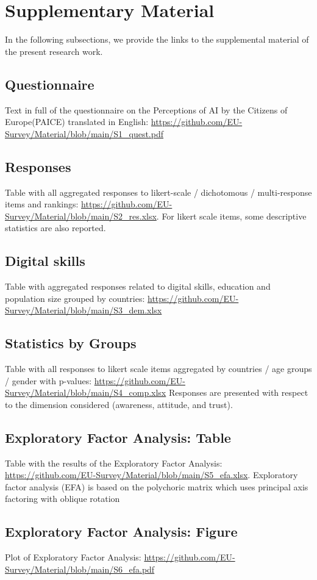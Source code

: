 \documentclass{article}
\begin{document}
\section{Supplementary Material}

In the following subsections, we provide the links to the supplemental material of the present research work. 

\subsection{Questionnaire}
\label{S1_Questionnaire}
Text in full of the questionnaire on the Perceptions of AI by the Citizens of Europe(PAICE) translated in English: \url{https://github.com/EU-Survey/Material/blob/main/S1_quest.pdf} 

\subsection{Responses}
\label{S2_Tab_Resp}

Table with all aggregated responses to likert-scale / dichotomous / multi-response items and rankings: 
\url{https://github.com/EU-Survey/Material/blob/main/S2_res.xlsx}. 
For likert scale items, some descriptive statistics are also reported.

\subsection{Digital skills}
\label{S3_Tab_Dem}

Table with aggregated responses related to digital skills, education and population size grouped by countries: \url{https://github.com/EU-Survey/Material/blob/main/S3_dem.xlsx}

\subsection{Statistics by Groups}
\label{S4_Tab_Comp}

Table with all responses to likert scale items aggregated by countries / age groups / gender with p-values: \url{https://github.com/EU-Survey/Material/blob/main/S4_comp.xlsx}
Responses are presented with respect to the dimension considered (awareness, attitude, and trust).

\subsection{Exploratory Factor Analysis: Table}
\label{S5_Tab_EFA}

Table with the results of the Exploratory Factor Analysis: \url{https://github.com/EU-Survey/Material/blob/main/S5_efa.xlsx}. Exploratory factor analysis (EFA) is based on the polychoric matrix which uses principal axis factoring with oblique rotation

\subsection{Exploratory Factor Analysis: Figure}
\label{S6_Fig_EFA}
Plot of Exploratory Factor Analysis: \url{https://github.com/EU-Survey/Material/blob/main/S6_efa.pdf}




\end{document}

